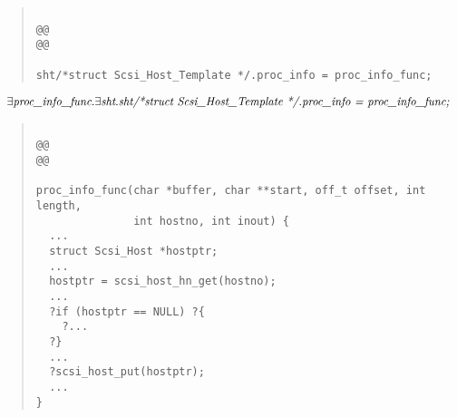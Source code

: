 \documentclass{article}
\newcommand{\mita}[1]{\mbox{\it{{#1}}}}
\begin{document}
\begin{quote}\begin{verbatim}

@@
@@

sht/*struct Scsi_Host_Template */.proc_info = proc_info_func;
\end{verbatim}\end{quote}

\[\begin{array}{l}
\exists \mita{proc\_info\_func} . \exists \mita{sht} . \mita{sht/*struct Scsi\_Host\_Template */.proc\_info = proc\_info\_func;}
\end{array}\]

\begin{quote}\begin{verbatim}

@@
@@

proc_info_func(char *buffer, char **start, off_t offset, int length,
               int hostno, int inout) {
  ...
  struct Scsi_Host *hostptr;
  ...
  hostptr = scsi_host_hn_get(hostno);
  ...
  ?if (hostptr == NULL) ?{
    ?...
  ?}
  ...
  ?scsi_host_put(hostptr);
  ...
}
\end{verbatim}\end{quote}
\end{document}
